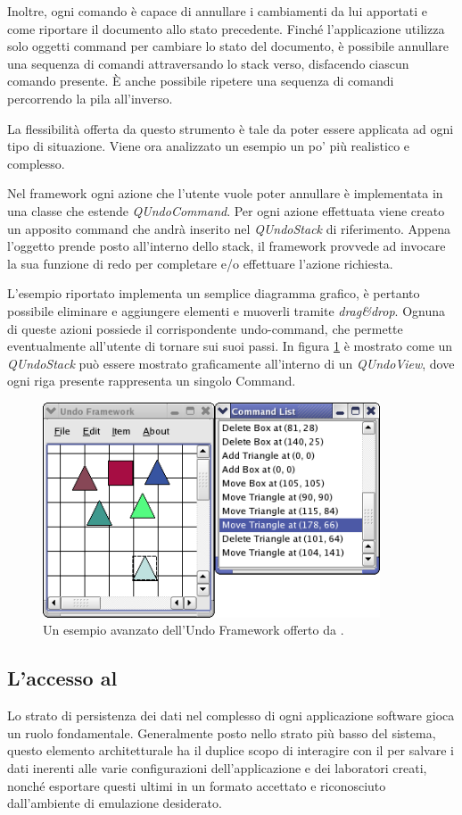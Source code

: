 Inoltre, ogni comando è capace di annullare i cambiamenti da lui apportati e come riportare il documento allo stato precedente. Finché l'applicazione utilizza solo oggetti command per cambiare lo stato del documento, è possibile annullare una sequenza di comandi attraversando lo stack verso, disfacendo ciascun comando presente. È anche possibile ripetere una sequenza di comandi percorrendo la pila all'inverso.

La flessibilità offerta da questo strumento è tale da poter essere applicata ad ogni tipo di situazione. Viene ora analizzato un esempio un po' più realistico e complesso.

Nel framework ogni azione che l'utente vuole poter annullare è implementata in una classe che estende \emph{QUndoCommand}. Per ogni azione effettuata viene creato un apposito command che andrà inserito nel \emph{QUndoStack} di riferimento. Appena l'oggetto prende posto all'interno dello stack, il framework provvede ad invocare la sua funzione di redo per completare e/o effettuare l'azione richiesta.

L'esempio riportato implementa un semplice diagramma grafico, è pertanto possibile eliminare e aggiungere elementi e muoverli tramite \emph{drag\&{}drop}. Ognuna di queste azioni possiede il corrispondente undo-command, che permette eventualmente all'utente di tornare sui suoi passi.
In figura \ref{figura:qt_undo} è mostrato come un \emph{QUndoStack} può essere mostrato graficamente all'interno di un \emph{QUndoView}, dove ogni riga presente rappresenta un singolo Command.

\begin{figure}[!htb]
	\centering
	\includegraphics[width=10cm]{images/undoframeworkexample.png}
	\caption{Un esempio avanzato dell'Undo Framework offerto da \qt{}.}
	\label{figura:qt_undo}
\end{figure}

\subsection{L'accesso al \fs{}}
Lo strato di persistenza dei dati nel complesso di ogni applicazione software gioca un ruolo fondamentale. Generalmente posto nello strato più basso del sistema, questo elemento architetturale ha il duplice scopo di interagire con il \fs{} per salvare i dati inerenti alle varie configurazioni dell'applicazione e dei laboratori creati, nonché esportare questi ultimi in un formato accettato e riconosciuto dall'ambiente di emulazione desiderato.

